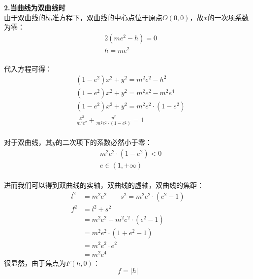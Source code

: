 \documentclass[UTF8]{ctexart}
\begin{document}
\newpage

    \textbf{2.当曲线为双曲线时}\\[3mm]
    \setcounter{equation}{0}
    由于双曲线的标准方程下，双曲线的中心点位于原点$O(0,0)$，故$x$的一次项系数为零：\vspace{5pt}
    \begin{align}
        &2\left(me^2-h\right)=0\\[3mm]
        &h=me^2
    \end{align}\\
    代入方程可得：
    \begin{align}
        &\left(1-e^2\right)x^2+y^2=m^2e^2-h^2\\[3mm]
        &\left(1-e^2\right)x^2+y^2=m^2e^2-m^2e^4\\[3mm]
        &\left(1-e^2\right)x^2+y^2=m^2e^2\cdot\left(1-e^2\right)\\[3mm]
        &\frac{x^2}{m^2e^2}+\frac{y^2}{m^2e^2\cdot\left(1-e^2\right)}=1
    \end{align}\\[1mm]
    对于双曲线，其$y$的二次项下的系数必然小于零：\vspace{5pt}
    \begin{align}
        &m^2e^2\cdot\left(1-e^2\right)<0\\[3mm]
        &e\in(1,+\infty)
    \end{align}\\
    进而我们可以得到双曲线的实轴，双曲线的虚轴，双曲线的焦距：\vspace{5pt}
    \begin{align}
        l^2&=m^2e^2\qquad s^2=m^2e^2\cdot\left(e^2-1\right)\\[4mm]
        f^2&=l^2+s^2\\[3mm]
        &=m^2e^2+m^2e^2\cdot\left(e^2-1\right)\\[3mm]
        &=m^2e^2\cdot\left(1+e^2-1\right)\\[3mm]
        &=m^2e^2\cdot e^2\\[3mm]
        &=m^2e^4
    \end{align}
    很显然，由于焦点为$F(h,0)$：
    \begin{equation}
        f=|h|
    \end{equation}

\newpage
\end{document}
